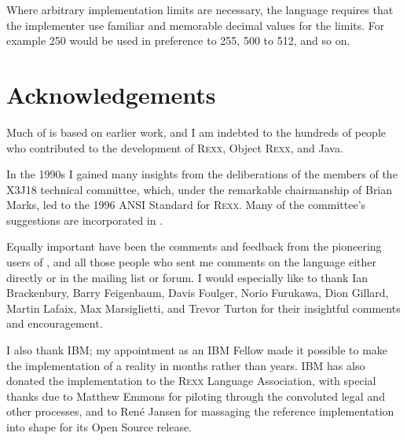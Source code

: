 Where arbitrary implementation limits are necessary, the language
requires that the implementer use familiar and memorable decimal
values for the limits. For example 250 would be used in preference to
255, 500 to 512, and so on.

\section{Acknowledgements}
Much of \nr{} is based on earlier work, and I am indebted to the hundreds of people who contributed to the development of R\textsc{exx}, Object R\textsc{exx}, and Java.

In the 1990s I gained many insights from the deliberations of the members of the X3J18 technical committee, which, under the remarkable chairmanship of Brian Marks, led to the 1996 ANSI Standard for R\textsc{exx}. Many of the committee's suggestions are incorporated in \nr{}.

Equally important have been the comments and feedback from the pioneering users of \nr{}, and all those people who sent me comments on the language either directly or in the \nr{} mailing list or forum. I would especially like to thank Ian Brackenbury, Barry Feigenbaum, Davis Foulger, Norio Furukawa, Dion Gillard, Martin Lafaix, Max Marsiglietti, and Trevor Turton for their insightful comments and encouragement.

I also thank IBM; my appointment as an IBM Fellow made it possible to make the implementation of \nr{} a reality in months rather than years. IBM has also donated the \nr{} implementation to the R\textsc{exx} Language Association, with special thanks due to Matthew Emmons for piloting \nr{} through the convoluted legal and other processes, and to Ren\'{e} Jansen for massaging the \nr{} reference implementation into shape for its Open Source release.

